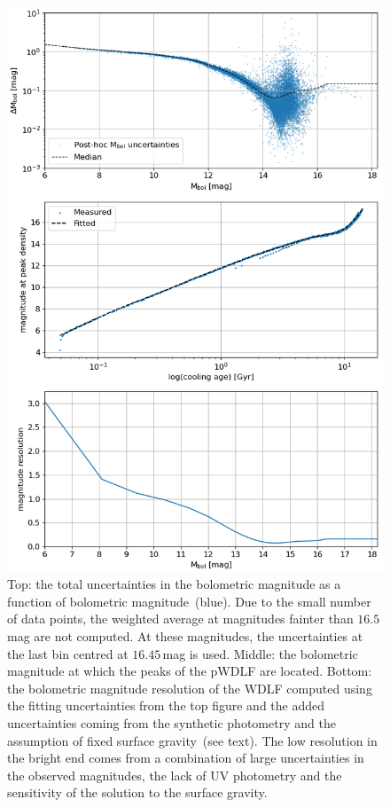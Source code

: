 \documentclass[fleqn,usenatbib]{mnras}
\begin{document}
\begin{figure}
    \includegraphics[width=\columnwidth]{figures/fig_03_mbol_sigma_magnitude_resoltuion.png}
    \caption{Top: the total uncertainties in the bolometric magnitude as a 
    function of bolometric magnitude~(blue). Due to the small
    number of data points, the weighted average at magnitudes fainter than
    $16.5$\,mag are not computed. At these magnitudes, the uncertainties at the
    last bin centred at $16.45$\,mag is used. Middle: the bolometric magnitude
    at which the peaks of the pWDLF are located. Bottom: the bolometric
    magnitude resolution of the WDLF computed using the fitting uncertainties
    from the top figure and the added uncertainties coming from the synthetic
    photometry and the assumption of fixed surface gravity~(see text). The
    low resolution in the bright end comes from a combination of large
    uncertainties in the observed magnitudes, the lack of UV photometry and the
    sensitivity of the solution to the surface gravity.}
    \label{fig:magnitude_resolution}
\end{figure}
\end{document}
